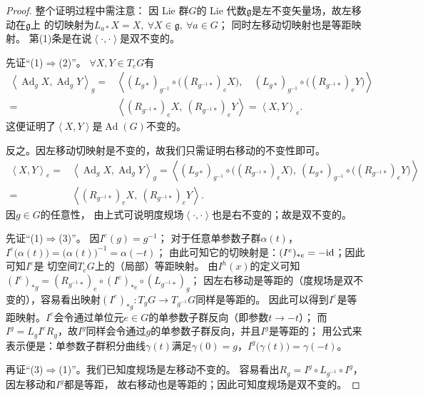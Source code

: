 \begin{proof}
    整个证明过程中需注意：
    因 Lie 群$G$的 Lie 代数$\mathfrak{g}$是左不变矢量场，故左移动在$\mathfrak{g}$上
    的切映射为$L_{a*} X = X,\  \forall X\in \mathfrak{g},\ \forall a\in G$；
    同时左移动切映射也是等距映射。
    第(1)条是在说$\left<\cdot,\cdot\right>$是双不变的。

    先证“(1)$\Rightarrow$(2)”。    $\forall X,Y \in T_e G$有
    \begin{align*}
        \left<\operatorname{Ad}_{g} X, \operatorname{Ad}_{g} Y\right>_{g} =&
        \left<(L_{g*})_{g^{-1}} \circ \bigl((R_{g^{-1}*})_{e} X\bigr) ,\quad
        (L_{g*})_{g^{-1}} \circ \bigl((R_{g^{-1}*})_{e} Y\bigr)\right> \\
        =& \left<(R_{g^{-1}*})_{e} X,\ (R_{g^{-1}*})_{e} Y \right>
        =\left<X,Y\right>_e .
    \end{align*}
    这便证明了$\left<X,Y\right>$是$\operatorname{Ad}(G)$不变的。

    反之。因左移动切映射是不变的，故我们只需证明右移动的不变性即可。
    \begin{align*}
        \left<X,Y\right>_e =& \left<\operatorname{Ad}_{g} X, \operatorname{Ad}_{g} Y\right>_{g}
        =   \left<(L_{g*})_{g^{-1}} \circ \bigl((R_{g^{-1}*})_{e} X\bigr) ,\
        (L_{g*})_{g^{-1}} \circ \bigl((R_{g^{-1}*})_{e} Y\bigr)\right> \\
        =&\left<(R_{g^{-1}*})_{e} X,\ (R_{g^{-1}*})_{e} Y \right> .
    \end{align*}
    因$g\in G$的任意性，
    由上式可说明度规场$\left<\cdot,\cdot\right>$也是右不变的；故是双不变的。

    先证“(1)$\Rightarrow$(3)”。
    因$I^e(g)=g^{-1}$；    对于任意单参数子群$\alpha(t)$，
    $I^e\bigl(\alpha(t)\bigr) = \bigl(\alpha(t)\bigr)^{-1}=\alpha(-t)$；
    由此可知它的切映射是：$(I^e)_{*e}=-\mathrm{id} $；因此可知$I^e$是
    切空间$T_e G$上的（局部）等距映射。
    由$I^h(x)$的定义可知$(I^e)_{*g}= (R_{g^{-1}*})_e \circ (I^e)_{*e}\circ (L_{g^{-1}*})_g$；
    因左右移动是等距的（度规场是双不变的），容易看出映射$(I^e)_{*g}: T_g G \to T_{g^{-1}}G$同样是等距的。
    因此可以得到$I^e$是等距映射。$I^e$会令通过单位元$e\in G$的单参数子群反向（即参数$t\to -t$）；
    而$I^g=L_g I^e R_g$，故$I^g$同样会令通过$g$的单参数子群反向，并且$I^g$是等距的；
    用公式来表示便是：单参数子群积分曲线$\gamma(t)$满足$\gamma(0)=g$，$I^g\bigl(\gamma(t)\bigr) = \gamma(-t)$。

    再证“(3)$\Rightarrow$(1)”。我们已知度规场是左移动不变的。
    容易看出$R_g = I^g\circ L_{g^{-1}}\circ I^g$，因左移动和$I^g$都是等距，
    故右移动也是等距的；因此可知度规场是双不变的。


\end{proof}
